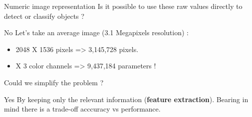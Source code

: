 \documentclass[tikz,table,border=2mm]{beamer}
\begin{document}
\begin{frame}{Numeric image representation}
Is it possible to use these raw values directly to detect or classify objects ?
\begin{alertblock}{No}
    Let's take an average image  (3.1 Megapixels resolution) :
    \begin{itemize}
	\item  2048 X 1536 pixels => 3,145,728 pixels.
	\item X 3 color channels => 9,437,184 parameters !
	\end{itemize}
\end{alertblock}
Could we simplify the problem ?
\begin{block}{Yes}
By keeping only the relevant information (\textbf{feature extraction}). Bearing in mind there is a trade-off acccuracy vs performance.
\end{block}

\end{frame}
\end{document}
